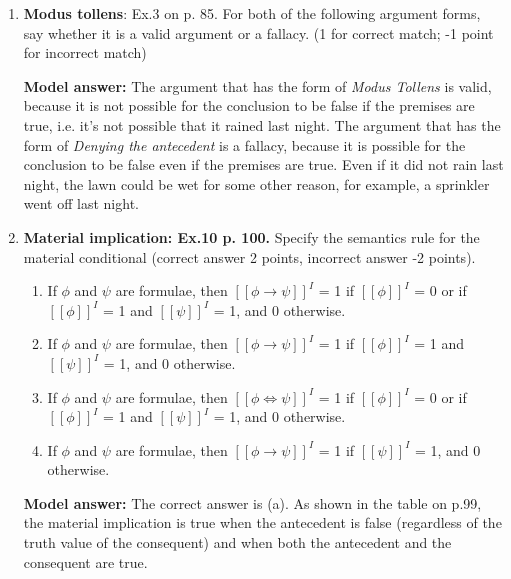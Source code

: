 \documentclass[a4,11pt]{article}
\begin{document}
\begin{enumerate}[leftmargin = 12pt]
\begin{enumerate}[noitemsep]
\item Modus Ponens
\item Modus Tollens
\item Denying the antecedent
\item Affirming the consequent
\end{enumerate}

{\bf Model answer:} The correct answer is \textit{Modus Tollens}.

\item {\bf Modus tollens}: Ex.3 on p. 85. For both of the following argument forms, say whether it is a valid argument or a fallacy.  (1 for correct match; -1 point for incorrect match)

{\bf Model answer:} The argument that has the form of {\it Modus Tollens} is valid, because it is not possible for the conclusion to be false if the premises are true, i.e. it's not possible that it rained last night. The argument that has the form of {\it Denying the antecedent} is a fallacy, because it is possible for the conclusion to be false even if the premises are true. Even if it did not rain last night, the lawn could be wet for some other reason, for example, a sprinkler went off last night.


\item {\bf  Material implication: Ex.10 p. 100.} Specify the semantics rule for the material conditional (correct answer 2 points, incorrect answer -2 points).

\begin{enumerate}
\item If $\phi$ and $\psi$ are formulae, then $[[\phi \to \psi]]^{I}$ = 1 if $[[\phi]]^{I}$ = 0 or if $[[\phi]]^{I}$ = 1 and $[[\psi]]^{I}$ = 1, and 0 otherwise. 
\item If $\phi$ and $\psi$ are formulae, then $[[\phi \to \psi]]^{I}$ = 1 if $[[\phi]]^{I}$ = 1 and $[[\psi]]^{I}$ = 1, and 0 otherwise. 
\item If $\phi$ and $\psi$ are formulae, then $[[\phi \iff \psi]]^{I}$ = 1 if $[[\phi]]^{I}$ = 0 or if $[[\phi]]^{I}$ = 1 and $[[\psi]]^{I}$ = 1, and 0 otherwise. 
\item If $\phi$ and $\psi$ are formulae,  then $[[\phi \to \psi]]^{I}$ = 1 if $[[\psi]]^{I}$ = 1, and 0 otherwise. 
\end{enumerate}

{ \bf Model answer:}  The correct answer is (a). As shown in the table on p.99, the material implication is true when the antecedent is false (regardless of the truth value of the consequent) and when both the antecedent and the consequent are true.


\end{enumerate}
\end{document}
